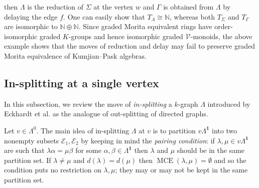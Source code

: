 \documentclass[12pt]{amsart}
\newcommand{\MCE}{\operatorname{MCE}}
\theoremstyle{definition}
\theoremstyle{remark}
\begin{document}
then $\Lambda$ is the reduction of $\Sigma$ at the vertex $w$ and $\Gamma$ is obtained from $\Lambda$ by delaying the edge $f$. One can easily show that $T_\Lambda\cong \mathbb{N}$, whereas both $T_\Sigma$ and $T_\Gamma$ are isomorphic to $\mathbb{N}\oplus \mathbb{N}$. Since graded Morita equivalent rings have order-isomorphic graded $K$-groups and hence isomorphic graded $\mathcal{V}$-monoids, the above example shows that the moves of reduction and delay may fail to preserve graded Morita equivalence of Kumjian--Pask algebras. 

\subsection{In-splitting at a single vertex}\label{ssec in-slitting}
In this subsection, we review the move of \emph{in-splitting} a $k$-graph $\Lambda$ introduced by Eckhardt et al. \cite[Section 3]{EFGGGP} as the analogue of out-splitting of directed graphs. 

Let $v\in \Lambda^0$. The main idea of in-splitting $\Lambda$ at $v$ is to partition $v\Lambda^\mathbf{1}$ into two nonempty subsets $\mathcal{E}_1,\mathcal{E}_2$ by keeping in mind the \emph{pairing condition}: if $\lambda,\mu\in v\Lambda^\mathbf{1}$ are such that $\lambda \alpha=\mu\beta$ for some $\alpha,\beta\in \Lambda^\mathbf{1}$ then $\lambda$ and $\mu$ should be in the same partition set. If $\lambda\neq \mu$ and $d(\lambda)=d(\mu)$ then $\MCE(\lambda,\mu)=\emptyset$ and so the condition puts no restriction on $\lambda,\mu$; they may or may not be kept in the same partition set. 
\end{document}

